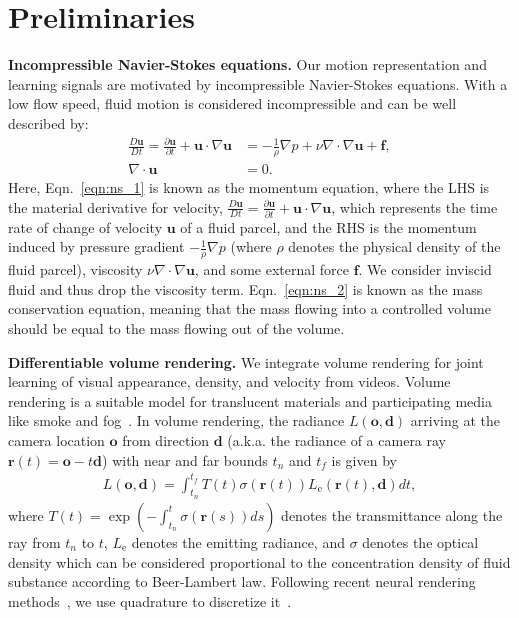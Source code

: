 \documentclass{article}
\newcommand{\eqn}[1]{Eqn.~\ref{#1}}
\newcommand{\myparagraph}[1]{\vspace{0.1cm}\noindent\textbf{#1}}
\begin{document}
 \section{Preliminaries}
\myparagraph{Incompressible Navier-Stokes equations.} 
Our motion representation and learning signals are motivated by incompressible Navier-Stokes equations.
With a low flow speed, fluid motion is considered incompressible and can be well described by:
\begin{align}
    \frac{D\mathbf{u}}{Dt}=\frac{\partial\mathbf{u}}{\partial t}+\mathbf{u}\cdot\nabla\mathbf{u} &= -\frac{1}{\rho}\nabla p +\nu\nabla\cdot\nabla\mathbf{u}+\mathbf{f}, \label{eqn:ns_1}
    \\
    \nabla\cdot\mathbf{u}&=0. \label{eqn:ns_2}
\end{align}
Here, \eqn{eqn:ns_1} is known as the momentum equation, where the LHS is the material derivative for velocity, $\frac{D\mathbf{u}}{Dt}=\frac{\partial\mathbf{u}}{\partial t}+\mathbf{u}\cdot\nabla\mathbf{u}$, which represents the time rate of change of velocity $\mathbf{u}$ of a fluid parcel, and the RHS is the momentum induced by pressure gradient $-\frac{1}{\rho}\nabla p$ (where $\rho$ denotes the physical density of the fluid parcel), viscosity $\nu\nabla\cdot\nabla\mathbf{u}$, and some external force $\mathbf{f}$. We consider inviscid fluid and thus drop the viscosity term. \eqn{eqn:ns_2} is known as the mass conservation equation, meaning that the mass flowing into a controlled volume should be equal to the mass flowing out of the volume.

\myparagraph{Differentiable volume rendering.} We integrate volume rendering for joint learning of visual appearance, density, and velocity from videos. Volume rendering is a suitable model for translucent materials and participating media like smoke and fog~\citep{kajiya1984ray}. In volume rendering, the radiance $L(\mathbf{o}, \mathbf{d})$ arriving at the camera location $\mathbf o$ from direction $\mathbf{d}$ (a.k.a. the radiance of a camera ray $\mathbf{r}(t)=\mathbf{o}-t\mathbf{d}$) with near and far bounds $t_n$ and $t_f$ is given by
\begin{align}\label{eqn:vol_render}
    L(\mathbf{o}, \mathbf{d}) = \int_{t_n}^{t_f} T(t)\sigma(\mathbf{r}(t))L_\text{e}(\mathbf{r}(t),\mathbf{d})dt,
\end{align}
where $T(t)=\exp(-\int_{t_n}^t \sigma(\mathbf{r}(s))ds)$ denotes the transmittance along the ray from $t_n$ to $t$, $L_\text{e}$ denotes the emitting radiance, and $\sigma$ denotes the optical density which can be considered proportional to the concentration density of fluid substance according to Beer-Lambert law. Following recent neural rendering methods~\citep{mildenhall2020nerf}, we use quadrature to discretize it~\citep{max1995optical}.
\end{document}
